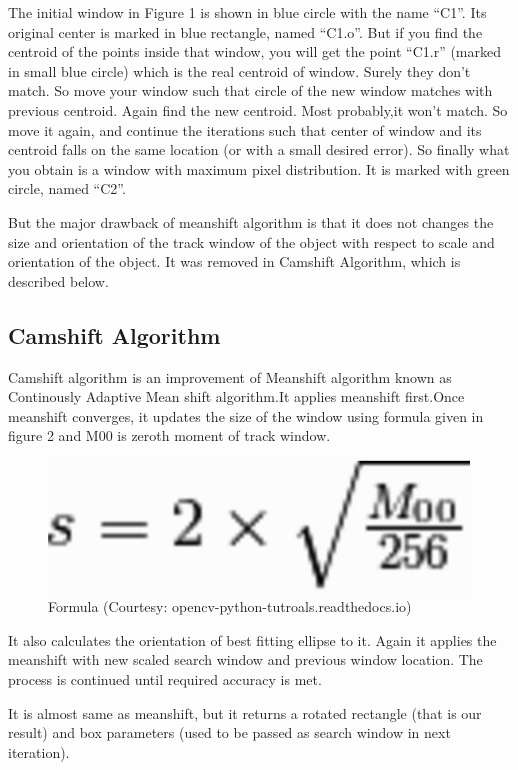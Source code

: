 \documentclass[11pt,a4paper]{article}
\begin{document}
			The initial window in Figure 1 is shown in blue circle with the name “C1”. Its original center is marked in blue rectangle, named “C1.o”. But if you find the centroid of the points inside that window, you will get the point “C1.r” (marked in small blue circle) which is the real centroid of window. Surely they don’t match. So move your window such that circle of the new window matches with previous centroid. Again find the new centroid. Most probably,it won’t match. So move it again, and continue the iterations such that center of window and its centroid falls on the same location (or with a small desired error). So finally what you obtain is a window with maximum pixel distribution. It is marked with green circle, named “C2”.
			
			But the major drawback of meanshift algorithm is that it does not changes the size and orientation of the track window of the object with respect to scale and orientation of the object. It was removed in Camshift Algorithm, which is described below.
		\subsection{Camshift Algorithm}
			Camshift algorithm is an improvement of Meanshift algorithm known as Continously Adaptive Mean shift algorithm.It applies meanshift first.Once meanshift converges, it updates the size of the window using formula given in figure 2 and M00 is zeroth moment of track window.
			\begin{figure}[h!]
				\includegraphics[scale=0.5 ]{../Images/scale_estimation.JPG}
				\centering
				\caption{Formula (Courtesy: opencv-python-tutroals.readthedocs.io)}
			\end{figure}
			
			It also calculates the orientation of best fitting ellipse to it. Again it applies the meanshift with new scaled search window and previous window location. The process is continued until required accuracy is met.
			
			It is almost same as meanshift, but it returns a rotated rectangle (that is our result) and box parameters (used to be passed as search window in next iteration).
			
\end{document}
